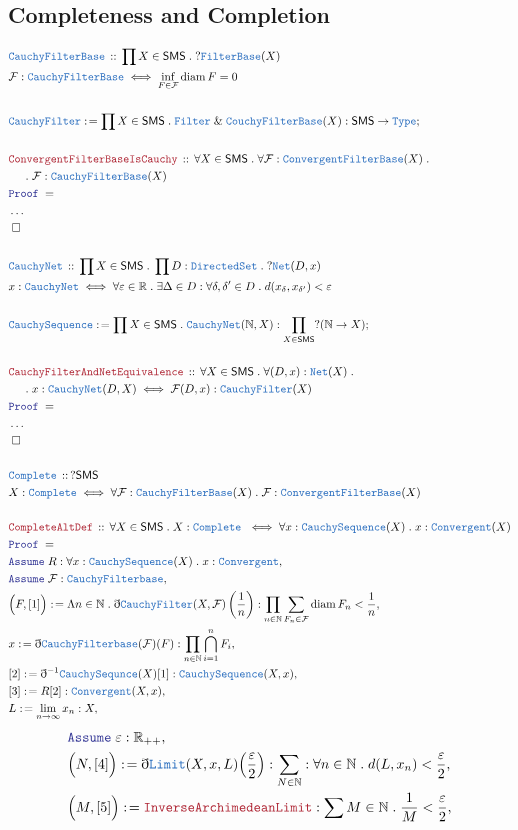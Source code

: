 \documentclass[12pt]{scrartcl}
\newcommand{\TYPE}[1]{\textcolor{NavyBlue}{\mathtt{#1}}}
\newcommand{\LOGIC}[1]{\textcolor{Blue}{\mathtt{#1}}}
\newcommand{\THM}[1]{\textcolor{Maroon}{\mathtt{#1}}}
\renewcommand{\.}{\; . \;}
\newcommand{\de}{: \kern 0.1pc =}
\newcommand{\Act}[1]{\left( #1 \right)}
\newcommand{\Theorem}[2]{& \THM{#1} \, :: \, #2 \\ & \Proof = \\ }
\newcommand{\DeclareType}[2]{& \TYPE{#1} \, :: \, #2 \\}
\newcommand{\DefineType}[3]{& #1 : \TYPE{#2} \iff #3 \\}
\newcommand{\NewLine}{\\ & \kern 1pc}
\newcommand{\Page}[1]{ \begin{align*} #1 \end{align*}   }
\newcommand{ \bd }{ \ByDef }
\newcommand{\NoProof}{ & \ldots \\ \EndProof}
\renewcommand{\And}{\; \& \;}
\newcommand{\Type}{\TYPE{Type}}
\newcommand{\Reals}{\mathbb{R} }
\newcommand{\Nat}{\mathbb{N} }
\newcommand{\Say}[3]{& #1 \de #2 : #3, \\}
\newcommand{\Conclude}[3]{& #1 \de #2 : #3; \\}
\newcommand{\Assume}[2]{& \LOGIC{Assume} \; #1 : #2, \\}
\newcommand{\QED}{\; \square}
\newcommand{\EndProof}{& \QED \\}
\newcommand{\ByDef}{\eth}
\newcommand{\Proof}{\LOGIC{Proof} \; }
\newcommand{\F}{\mathcal{F}}
\DeclareMathOperator{\diam}{diam}
\newcommand{\SMS}{\mathsf{SMS}}
\begin{document}
\subsection{Completeness and Completion}
\Page{
	\DeclareType{CauchyFilterBase}{\prod X \in \SMS \. ?\TYPE{FilterBase}(X)}
	\DefineType{\F}{CauchyFilterBase}{\inf_{F \in \F} \diam F = 0 }
	\\
	\Conclude{\TYPE{CauchyFilter}}{\prod X \in \SMS \. \TYPE{Filter} \And \TYPE{CouchyFilterBase}(X) }{\SMS \to \Type}
	\\
	\Theorem{ConvergentFilterBaseIsCauchy}{\forall X \in \SMS \. \forall \F : \TYPE{ConvergentFilterBase}(X) \.  \NewLine \. \F : \TYPE{CauchyFilterBase}(X) }
	\NoProof
	\\
	\DeclareType{CauchyNet}{ \prod X \in \SMS \. \prod D : \TYPE{DirectedSet} \. ?\TYPE{Net}(D,x)}
	\DefineType{x}{CauchyNet}{
		\forall \varepsilon \in \Reals \. 
		\exists \Delta \in D : \forall \delta,\delta' \in D  \.             
		d(x_{\delta},x_{\delta'}) < \varepsilon 
	}
	\\
	\Conclude{\TYPE{CauchySequence}}{\prod X \in \SMS \. \TYPE{CauchyNet}(\Nat,X)}{\prod_{X \in \SMS} ?(\Nat \to X)  }
	\\
	\Theorem{CauchyFilterAndNetEquivalence}{
		\forall X \in \SMS \. 
		\forall (D,x) : \TYPE{Net}(X) \.   \NewLine \.
		x : \TYPE{CauchyNet}(D,X) \iff \F(D,x) : \TYPE{CauchyFilter}(X)  
	}
	\NoProof
	\\
	\DeclareType{Complete}{?\SMS}
	\DefineType{X}{Complete}{\forall \F : \TYPE{CauchyFilterBase}(X) \. \F : \TYPE{ConvergentFilterBase}(X)}
	\\
	\Theorem{CompleteAltDef}{
		\forall X \in \SMS \. X : \TYPE{Complete} \
		\iff 
		\forall x : \TYPE{CauchySequence}(X) \. 
		x : \TYPE{Convergent}(X)	
	}
	\Assume{R}{\forall x : \TYPE{CauchySequence}(X) \. x : \TYPE{Convergent}}
	\Assume{\F}{\TYPE{CauchyFilterbase}}
	\Say{\Big(F,[1]\Big)}{\Lambda n \in \Nat \. \bd \TYPE{CauchyFilter}(X,\F)\Act{\frac{1}{n}}}
	{ \prod_{n \in \Nat}  \sum_{F_n \in \F}  \diam F_n  < \frac{1}{n} }
	\Say{x}{\bd \TYPE{CauchyFilterbase}(\F)(F)}{\prod_{n \in \Nat} \bigcap^n_{i=1} F_{i}}
	\Say{[2]}{\bd^{-1}\TYPE{CauchySequnce}(X)[1]}{\TYPE{CauchySequence}(X,x)}
	\Say{[3]}{R[2]}{\TYPE{Convergent}(X,x)}
	\Say{L}{\lim_{n \to \infty} x_n}{X}
	}\Page{
	\Assume{\varepsilon}{\Reals_{++}}
	\Say{\Big(N,[4]\Big)}{\bd \TYPE{Limit}(X,x,L)\Big( \frac{\varepsilon}{2} \Big)}
	{\sum_{N \in \Nat} : \forall n \in \Nat \.  d(L,x_n) < \frac{\varepsilon}{2}}
	\Say{\Big(M,[5] \Big)}{\THM{InverseArchimedeanLimit}}
	{
		\sum M \in \Nat \.   \frac{1}{M} < \frac{\varepsilon}{2}
}}
\end{document}
